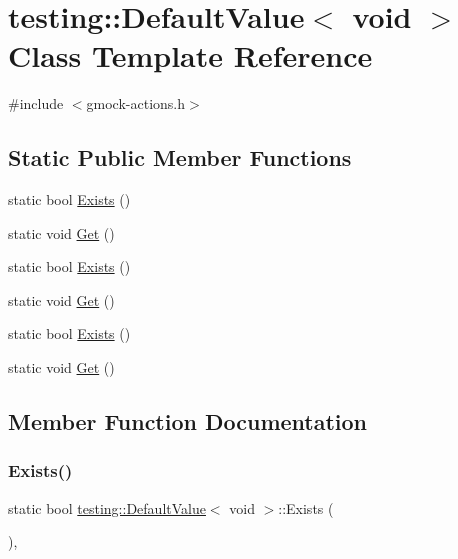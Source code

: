 \hypertarget{classtesting_1_1_default_value_3_01void_01_4}{}\section{testing\+::Default\+Value$<$ void $>$ Class Template Reference}
\label{classtesting_1_1_default_value_3_01void_01_4}


{\ttfamily \#include $<$gmock-\/actions.\+h$>$}

\subsection*{Static Public Member Functions}
\begin{DoxyCompactItemize}
\item 
static bool \mbox{\hyperlink{classtesting_1_1_default_value_3_01void_01_4_ae18ea46cbf928b820c91f15fa7aa317b}{Exists}} ()
\item 
static void \mbox{\hyperlink{classtesting_1_1_default_value_3_01void_01_4_acda4c367a5b0c0cfb28bc2289f385eed}{Get}} ()
\item 
static bool \mbox{\hyperlink{classtesting_1_1_default_value_3_01void_01_4_ae18ea46cbf928b820c91f15fa7aa317b}{Exists}} ()
\item 
static void \mbox{\hyperlink{classtesting_1_1_default_value_3_01void_01_4_acda4c367a5b0c0cfb28bc2289f385eed}{Get}} ()
\item 
static bool \mbox{\hyperlink{classtesting_1_1_default_value_3_01void_01_4_ae18ea46cbf928b820c91f15fa7aa317b}{Exists}} ()
\item 
static void \mbox{\hyperlink{classtesting_1_1_default_value_3_01void_01_4_acda4c367a5b0c0cfb28bc2289f385eed}{Get}} ()
\end{DoxyCompactItemize}


\subsection{Member Function Documentation}
\mbox{\label{classtesting_1_1_default_value_3_01void_01_4_ae18ea46cbf928b820c91f15fa7aa317b}} 
\subsubsection{\texorpdfstring{Exists()}{Exists()}\hspace{0.1cm}{\footnotesize\ttfamily [1/3]}}
{\footnotesize\ttfamily static bool \mbox{\hyperlink{classtesting_1_1_default_value}{testing\+::\+Default\+Value}}$<$ void $>$\+::Exists (\begin{DoxyParamCaption}{ }\end{DoxyParamCaption})\hspace{0.3cm}{\ttfamily [inline]}, {\ttfamily [static]}}

